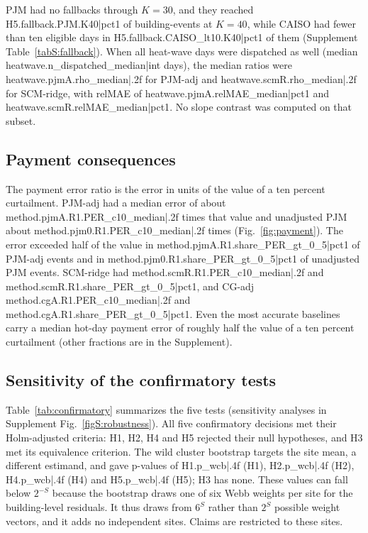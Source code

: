 PJM had no fallbacks through $K=30$, and they reached {{H5.fallback.PJM.K40|pct1}} of building-events at $K=40$, while CAISO had fewer than ten eligible days in {{H5.fallback.CAISO_lt10.K40|pct1}} of them (Supplement Table~\ref{tabS:fallback}). When all heat-wave days were dispatched as well (median {{heatwave.n_dispatched_median|int}} days), the median ratios were {{heatwave.pjmA.rho_median|.2f}} for PJM-adj and {{heatwave.scmR.rho_median|.2f}} for SCM-ridge, with relMAE of {{heatwave.pjmA.relMAE_median|pct1}} and {{heatwave.scmR.relMAE_median|pct1}}. No slope contrast was computed on that subset.

\subsection{Payment consequences}\label{sec:results:payment}

The payment error ratio is the error in units of the value of a ten percent curtailment. PJM-adj had a median error of about {{method.pjmA.R1.PER_c10_median|.2f}} times that value and unadjusted PJM about {{method.pjm0.R1.PER_c10_median|.2f}} times (Fig.~\ref{fig:payment}). The error exceeded half of the value in {{method.pjmA.R1.share_PER_gt_0_5|pct1}} of PJM-adj events and in {{method.pjm0.R1.share_PER_gt_0_5|pct1}} of unadjusted PJM events. SCM-ridge had {{method.scmR.R1.PER_c10_median|.2f}} and {{method.scmR.R1.share_PER_gt_0_5|pct1}}, and CG-adj {{method.cgA.R1.PER_c10_median|.2f}} and {{method.cgA.R1.share_PER_gt_0_5|pct1}}. Even the most accurate baselines carry a median hot-day payment error of roughly half the value of a ten percent curtailment (other fractions are in the Supplement).

\subsection{Sensitivity of the confirmatory tests}\label{sec:results:robust}

Table~\ref{tab:confirmatory} summarizes the five tests (sensitivity analyses in Supplement Fig.~\ref{figS:robustness}). All five confirmatory decisions met their Holm-adjusted criteria: H1, H2, H4 and H5 rejected their null hypotheses, and H3 met its equivalence criterion. The wild cluster bootstrap targets the site mean, a different estimand, and gave p-values of {{H1.p_wcb|.4f}} (H1), {{H2.p_wcb|.4f}} (H2), {{H4.p_wcb|.4f}} (H4) and {{H5.p_wcb|.4f}} (H5); H3 has none. These values can fall below $2^{-S}$ because the bootstrap draws one of six Webb weights per site for the building-level residuals. It thus draws from $6^{S}$ rather than $2^{S}$ possible weight vectors, and it adds no independent sites. Claims are restricted to these sites.

